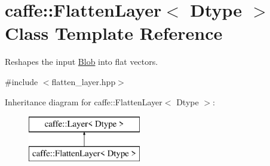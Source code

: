 \hypertarget{classcaffe_1_1FlattenLayer}{}\section{caffe\+:\+:Flatten\+Layer$<$ Dtype $>$ Class Template Reference}
\label{classcaffe_1_1FlattenLayer}


Reshapes the input \hyperlink{classcaffe_1_1Blob}{Blob} into flat vectors.  




{\ttfamily \#include $<$flatten\+\_\+layer.\+hpp$>$}

Inheritance diagram for caffe\+:\+:Flatten\+Layer$<$ Dtype $>$\+:\begin{figure}[H]
\begin{center}
\leavevmode
\includegraphics[height=2.000000cm]{classcaffe_1_1FlattenLayer}
\end{center}
\end{figure}
